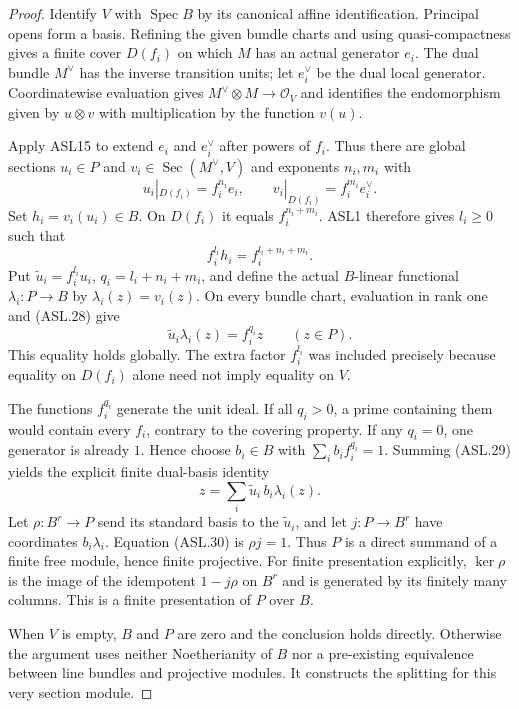 \documentclass[11pt,a4paper]{article}
\numberwithin{equation}{section}
\theoremstyle{remark}\newtheorem{remark}[theorem]{Remark}
\begin{document}
\begin{proof}
Identify $V$ with $\operatorname{Spec}B$ by its canonical affine
identification.  Principal opens form a basis.  Refining the
given bundle charts and using quasi-compactness gives a finite
cover $D(f_i)$ on which $M$ has an actual generator $e_i$.
The dual bundle $M^\vee$ has the inverse transition units;
let $e_i^\vee$ be the dual local generator.  Coordinatewise
evaluation gives $M^\vee\otimes M\to\mathcal O_V$ and identifies
the endomorphism given by $u\otimes v$ with multiplication by
the function $v(u)$.

Apply ASL15 to extend $e_i$ and $e_i^\vee$ after powers of $f_i$.
Thus there are global sections $u_i\in P$ and
$v_i\in\operatorname{Sec}(M^\vee,V)$ and exponents $n_i,m_i$
with
\[
 u_i|_{D(f_i)}=f_i^{n_i}e_i,\qquad
 v_i|_{D(f_i)}=f_i^{m_i}e_i^\vee.
\]
Set $h_i=v_i(u_i)\in B$.  On $D(f_i)$ it equals
$f_i^{n_i+m_i}$.  ASL1 therefore gives $l_i\ge0$ such that
\[
               f_i^{l_i}h_i=f_i^{l_i+n_i+m_i}.       \tag{ASL.28}
\]
Put $\widetilde u_i=f_i^{l_i}u_i$,
$q_i=l_i+n_i+m_i$, and define the actual $B$-linear functional
$\lambda_i:P\to B$ by $\lambda_i(z)=v_i(z)$.
On every bundle chart, evaluation in rank one and (ASL.28) give
\[
                 \widetilde u_i\lambda_i(z)=f_i^{q_i}z
                       \qquad(z\in P).               \tag{ASL.29}
\]
This equality holds globally.  The extra factor $f_i^{l_i}$
was included precisely because equality on $D(f_i)$ alone
need not imply equality on $V$.

The functions $f_i^{q_i}$ generate the unit ideal.  If all
$q_i>0$, a prime containing them would contain every $f_i$,
contrary to the covering property.  If any $q_i=0$, one
generator is already $1$.  Hence choose $b_i\in B$ with
$\sum_i b_if_i^{q_i}=1$.  Summing (ASL.29) yields the
explicit finite dual-basis identity
\[
                    z=\sum_i\widetilde u_i\,
                                      b_i\lambda_i(z).  \tag{ASL.30}
\]
Let $\rho:B^r\to P$ send its standard basis to the
$\widetilde u_i$, and let
$j:P\to B^r$ have coordinates $b_i\lambda_i$.
Equation (ASL.30) is $\rho j=1$.  Thus $P$ is a direct
summand of a finite free module, hence finite projective.
For finite presentation explicitly, $\ker\rho$ is the image
of the idempotent $1-j\rho$ on $B^r$ and is generated by
its finitely many columns.  This is a finite presentation
of $P$ over $B$.

When $V$ is empty, $B$ and $P$ are zero and the conclusion
holds directly.  Otherwise the argument uses neither
Noetherianity of $B$ nor a pre-existing equivalence between
line bundles and projective modules.  It constructs the
splitting for this very section module.
\end{proof}
\end{document}
